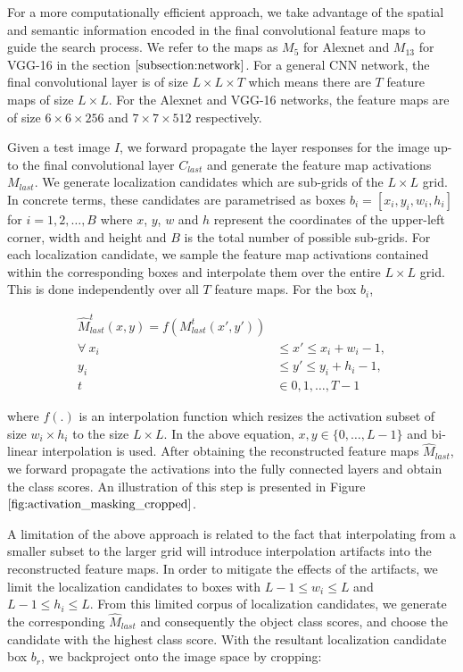 \documentclass[runningheads]{llncs}
\begin{document}
For a more computationally efficient approach, we take advantage of the spatial and semantic information encoded in the final convolutional feature maps to guide the search process. We refer to the maps as $M_5$ for Alexnet and $M_{13}$ for VGG-16 in the section $\ref{subsection:network}$. For a general CNN network, the final convolutional layer is of size $L\times L \times T$ which means there are $T$ feature maps of size $L \times L$. For the Alexnet and VGG-16 networks, the feature maps are of size  $6\times6\times256$ and $7\times7\times512$ respectively.

Given a test image $I$, we forward propagate the layer responses for the image up-to the final convolutional layer $C_{last}$ and generate the feature map activations $M_{last}$. We generate localization candidates which are sub-grids of the $L \times L$ grid. In concrete terms, these candidates are parametrised as  boxes $b_i = [x_i, y_i, w_i, h_i]$ for $i = 1,2,\ldots,B$ where $x$, $y$, $w$ and $h$ represent the coordinates of the upper-left corner, width and height and $B$ is the total number of possible sub-grids.
For each localization candidate, we sample the feature map activations contained within the  corresponding boxes and interpolate them over the entire $L \times L$ grid. This is done independently over all $T$ feature maps. For the box $b_i$,


\begin{align*}
\hat{M}_{last}^{t}(x,y) = f(M_{last}^{t}(x',  y')) \\  \forall \ x_i \ &\leq x' \leq x_i + w_i-1, \\ y_i \ &\leq y' \leq y_i + h_i-1, \\
t &\in {0, 1, \ldots, T-1}
\end{align*}

\noindent where $f(.)$ is an interpolation function which resizes the activation subset of size $w_i \times h_i$ to the size $L \times L$. In the above equation, $x, y \in \{ 0, \ldots, L-1\}$ and bi-linear interpolation is used.
After obtaining the reconstructed feature maps $\hat{M}_{last}$, we forward propagate the activations into the fully connected layers and obtain the class scores. An illustration of this step is presented in Figure $\ref{fig:activation_masking_cropped}$.

A limitation of the above approach is related to the fact that interpolating from a smaller subset to the larger grid will introduce interpolation artifacts into the reconstructed feature maps. In order to mitigate the effects of the artifacts, we limit the localization candidates to boxes with  $ L-1 \leq w_i \leq L $ and $L-1 \leq h_i \leq L$. From this limited corpus of localization candidates, we generate the corresponding $\hat{M}_{last}$ and consequently the object class scores, and choose the candidate with the highest class score. With the resultant localization candidate box $b_r$, we backproject onto the image space by cropping:
\end{document}
